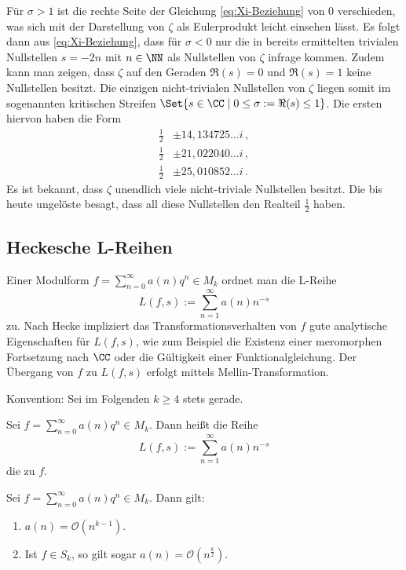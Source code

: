 Für $\sigma > 1$ ist die rechte Seite der Gleichung \eqref{eq:Xi-Beziehung} von $0$ verschieden, was sich mit der Darstellung von $\zeta$ als Eulerprodukt leicht einsehen lässt. Es folgt dann aus \eqref{eq:Xi-Beziehung}, dass für $\sigma < 0$ nur die in  bereits ermittelten \glqq{}trivialen Nullstellen\grqq{} $s = -2n$ mit $n \in \NN$ als Nullstellen von $\zeta$ infrage kommen. Zudem kann man zeigen, dass $\zeta$ auf den Geraden $\Re(s) = 0$ und $\Re(s) = 1$ keine Nullstellen besitzt. Die einzigen \glqq{}nicht-trivialen\grqq{} Nullstellen von $\zeta$ liegen somit im sogenannten \glqq{}kritischen Streifen\grqq{} $\Set {s \in \CC \mid 0 \leq \sigma := \Re(s) \leq 1}$. Die \glqq{}ersten\grqq{} hiervon haben die Form
\begin{align*}
	\tfrac 12 &\pm 14,134725\ldots i \,, \\
	\tfrac 12 &\pm 21,022040\ldots i \,, \\
	\tfrac 12 &\pm 25,010852\ldots i \,.
\end{align*}
Es ist bekannt, dass $\zeta$ unendlich viele nicht-triviale Nullstellen besitzt. Die bis heute ungelöste  besagt, dass all diese Nullstellen den Realteil $\frac 12$ haben.

\subsection{Heckesche L-Reihen}

Einer Modulform $f = \sum_{n=0}^\infty a(n) q^n \in M_k$ ordnet man die L-Reihe
\[
	L(f,s) := \sum_{n=1}^\infty a(n)n^{-s}
\]
zu. Nach Hecke impliziert das Transformationsverhalten von $f$ \glqq{}gute\grqq{} analytische Eigenschaften für $L(f,s)$, wie zum Beispiel die Existenz einer meromorphen Fortsetzung nach $\CC$ oder die Gültigkeit einer Funktionalgleichung. Der Übergang von $f$ zu $L(f,s)$ erfolgt mittels Mellin-Transformation.

Konvention: Sei im Folgenden $k \geq 4$ stets gerade. 

\begin{defi}
Sei $f = \sum_{n=0}^\infty a(n) q^n \in M_k$. Dann heißt die Reihe 
\[
	L(f,s) := \sum_{n=1}^\infty a(n)n^{-s}
\]
die  zu $f$. 
\end{defi}

\begin{satz}
Sei $f = \sum_{n=0}^\infty a(n) q^n \in M_k$. Dann gilt:
\begin{enumerate}
\item $a(n) = \mathcal O(n^{k-1})$.
\item Ist $f \in S_k$, so gilt sogar $a(n) = \mathcal O(n^{\frac k2})$.
\end{enumerate}
\end{satz}

